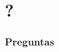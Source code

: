 \documentclass[hyperref={pdfpagelabels=false},tree-dvips,compress]{beamer}
\begin{document}
\section{?}
\begin{frame}[fragile]
\frametitle{Preguntas}
	\begin{center}
	\end{center}
\end{frame}
\end{document}
